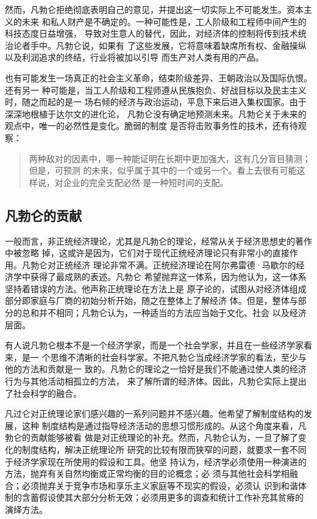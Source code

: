 然而，凡勃仑拒绝彻底表明自己的意见，并提出这一切实际上不可能发生。资本主义的未来
和私人财产是不确定的。一种可能性是，工人阶级和工程师中间产生的科技态度日益增强，
导致对生意人的替代，因此，对经济体的控制将传到技术统治论者手中。凡勃仑说，如果有
了这些发展，它将意味着缺席所有权、金融操纵以及利润追求的终结，行业将被加以引导
而生产对人类有用的产品。

也有可能发生一场真正的社会主义革命，结束阶级差异、王朝政治以及国际仇恨。还有另一
种可能是，当工人阶级和工程师遵从民族抱负、好战目标以及民主主义时，随之而起的是一
场右倾的经济与政治运动，平息下来后进入集权国家。由于深深地根植于达尔文的进化论，
凡勃仑没有确定地预测未来。凡勃仑关于未来的观点中，唯一的必然性是变化。脆弱的制度
是否将击败事务性的技术，还有待观察：

\begin{quotation}
  两种敌对的因素中，哪一种能证明在长期中更加强大，这有几分盲目猜测；但是，可预测
  的未来，似乎属于其中的一个或另一个。看上去很有可能这样说，对企业的完全支配必然
  是一种短时间的支配。
\end{quotation}

\subsection{凡勃仑的贡献}

一般而言，非正统经济理论，尤其是凡勃仑的理论，经常从关于经济思想史的著作中被忽略
掉，这或许是因为，它们对于现代正统经济理论只有非常小的直接作用。凡勃仑对正统经济
理论非常不满。正统经济理论在阿尔弗雷德·马歇尔的经济学中获得了最成熟的表述。凡勃仑
希望抛弃这一体系，因为他认为，这一体系坚持着错误的方法。他声称正统理论在方法上是
原子论的，试图从对经济体组成部分即家庭与厂商的初始分析开始，随之在整体上了解经济
体。但是，整体与部分的总和并不相同；凡勃仑认为，一种适当的方法应当始于文化、社会
以及经济层面。

有人说凡勃仑根本不是一个经济学家，而是一个社会学家，并且在一些经济学家看来，是一
个思维不清晰的社会科学家。不把凡勃仑当成经济学家的看法，至少与他的方法和贡献是一
致的。凡勃仑的理论之一恰好是我们不能通过使人类的经济行为与其他活动相孤立的方法，
来了解所谓的经济体。因此，凡勃仑实际上提出了社会科学的融合。

凡过仑对正统理论家们感兴趣的一系列问题并不感兴趣。他希望了解制度结构的发展，这种
制度结构是通过指导经济活动的思想习惯形成的。从这个角度来看，凡勃仑的贡献能够被看
做是对正统理论的补充。然而，凡勃仑认为，一旦了解了变化的制度结构，解决正统理论所
研究的比较有限而狭窄的问题，就要求一套不同于经济学家现在所使用的假设和工具。他坚
持认为，经济学必须使用一种演进的方法，抛弃有关自然均衡或正常均衡的目的论概念；必
须与其他社会科学相融合；必须抛弃关于竞争市场和享乐主义家庭等不现实的假设，必须认
识到和谐体制的含蓄假设使其大部分分析无效；必须用更多的调查和统计工作补充其贫瘠的
演绎方法。


